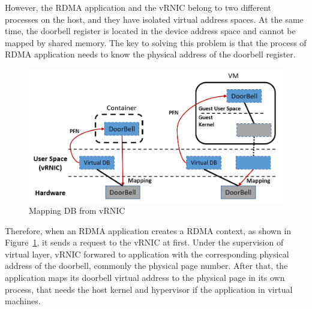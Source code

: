 However, the RDMA application and the vRNIC belong to two different processes on the host, and they have isolated virtual address spaces. At the same time, the doorbell register is located in the device address space and cannot be mapped by shared memory. The key to solving this problem is that the process of RDMA application needs to know the physical address of the doorbell register.

\begin{figure}[!ht]
	\centering
	\includegraphics[width=1.0\linewidth]{images/by-pass}
	\caption{Mapping DB from vRNIC}
	\label{fig:by-pass}
\end{figure}

Therefore, when an RDMA application creates a RDMA context, as shown in Figure~\ref{fig:by-pass}, it sends a request to the vRNIC at first. Under the supervision of virtual layer, vRNIC forwared to application with the corresponding physical address of the doorbell, commonly the physical page number. After that, the application maps its doorbell virtual address to the physical page in its own process, that needs the host kernel and hypervisor if the application in virtual machines.

